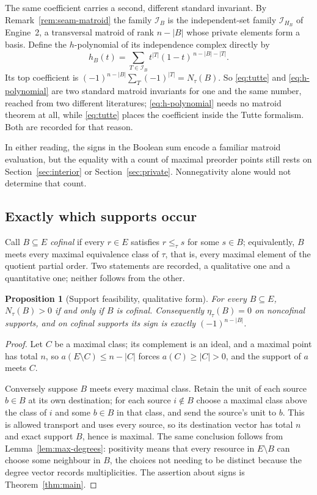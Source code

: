 \documentclass[11pt]{article}
\numberwithin{equation}{section}
\newtheorem{proposition}[theorem]{Proposition}
\theoremstyle{definition}
\theoremstyle{remark}
\newcommand{\Ical}{\mathcal I}
\begin{document}
The same coefficient carries a second, different standard invariant. By
Remark~\ref{rem:seam-matroid} the family $\Ical_B$ is the independent-set
family $\Ical_{H_B}$ of Engine~2, a transversal matroid of rank $n-|B|$ whose
private elements form a basis. Define the $h$-polynomial of its independence
complex directly by
\begin{equation}
 h_B(t)=\sum_{T\in\Ical_B}t^{|T|}(1-t)^{\,n-|B|-|T|} .
 \label{eq:h-polynomial}
\end{equation}
Its top coefficient is $(-1)^{n-|B|}\sum_T(-1)^{|T|}=N_\tau(B)$. So
\eqref{eq:tutte} and \eqref{eq:h-polynomial} are two standard matroid
invariants for one and the same number, reached from two different
literatures; \eqref{eq:h-polynomial} needs no matroid theorem at all, while
\eqref{eq:tutte} places the coefficient inside the Tutte formalism. Both are
recorded for that reason.

In either reading, the signs in the Boolean sum encode a familiar matroid
evaluation, but the equality with a count of maximal preorder points still
rests on Section~\ref{sec:interior} or Section~\ref{sec:private}.
Nonnegativity alone would not determine that count.

\subsection{Exactly which supports occur}
\label{sec:feasible}

Call $B\subseteq E$ \emph{cofinal} if every $r\in E$ satisfies $r\le_\tau s$
for some $s\in B$; equivalently, $B$ meets every maximal equivalence class of
$\tau$, that is, every maximal element of the quotient partial order. Two
statements are recorded, a qualitative one and a quantitative one; neither
follows from the other.

\begin{proposition}[Support feasibility, qualitative form]
\label{prop:support-feasible}
For every $B\subseteq E$, $N_\tau(B)>0$ if and only if $B$ is cofinal.
Consequently $\eta_\tau(B)=0$ on noncofinal supports, and on cofinal supports
its sign is exactly $(-1)^{n-|B|}$.
\end{proposition}

\begin{proof}
Let $C$ be a maximal class; its complement is an ideal, and a maximal point
has total $n$, so $a(E\setminus C)\le n-|C|$ forces $a(C)\ge|C|>0$, and the
support of $a$ meets $C$.

Conversely suppose $B$ meets every maximal class. Retain the unit of each
source $b\in B$ at its own destination; for each source $i\notin B$ choose a
maximal class above the class of $i$ and some $b\in B$ in that class, and send
the source's unit to $b$. This is allowed transport and uses every source, so
its destination vector has total $n$ and exact support $B$, hence is maximal.
The same conclusion follows from Lemma~\ref{lem:max-degrees}: positivity means
that every resource in $E\setminus B$ can choose some neighbour in $B$, the
choices not needing to be distinct because the degree vector records
multiplicities. The assertion about signs is Theorem~\ref{thm:main}.
\end{proof}
\end{document}
